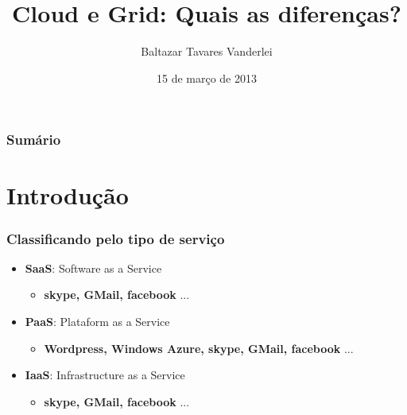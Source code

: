 \documentclass[10pt]{beamer}
\title[]{\textbf{Cloud} e \textbf{Grid}: Quais as diferenças?}
\author[]{Baltazar Tavares Vanderlei}
\date{15 de março de 2013}
\institute[2013]{Laboratório de Computação Científica e Visualização - LCCV/UFAL}
\begin{document}
\newcommand{\til}{\~{}}

\frame{\titlepage}
	\begin{frame}[t]
	\frametitle{Sumário}
	\tableofcontents[framebreaks]
\end{frame}



\section{Introdução}
	\begin{frame}%
	\frametitle{Classificando pelo tipo de serviço}
		\begin{itemize}%
			\item \textbf{SaaS}: Software as a Service
			\begin{itemize}
				\item \textbf{skype, GMail, facebook} ...
			\end{itemize}
			\item \textbf{PaaS}: Plataform as a Service
			\begin{itemize}
				\item \textbf{Wordpress, Windows Azure, skype, GMail, facebook} ...
			\end{itemize}
			\item \textbf{IaaS}: Infrastructure as a Service
			\begin{itemize}
				\item \textbf{skype, GMail, facebook} ...
			\end{itemize}
		\end{itemize}
	\end{frame}
\end{document}
